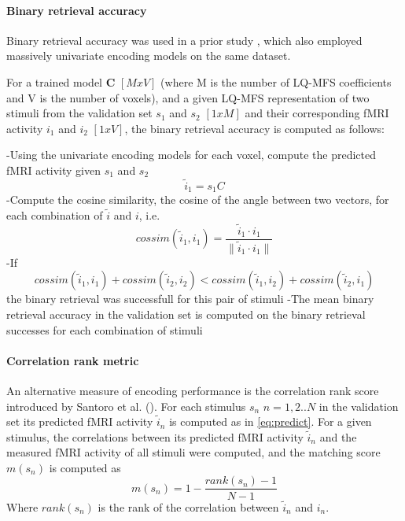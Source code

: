
\paragraph{Binary retrieval accuracy}

Binary retrieval accuracy \cite{ML08} was used in a prior study \cite{CTK+2012}, which also employed massively univariate encoding models on the same dataset.

For a trained model $\mathbf{C}$ $[M x V]$ (where M is the number of LQ-MFS coefficients and V is the number of voxels), and a given LQ-MFS representation of two stimuli from the validation set $s_{1}$ and $s_{2}$ $[1 x M]$ and their corresponding f{MRI} activity $i_{1}$ and $i_{2}$ $[ 1 x V ]$, the binary retrieval accuracy is computed as follows:

-Using the univariate encoding models for each voxel, compute the predicted f{MRI} activity given $s_{1}$ and $s_{2}$ 
\begin{equation}\label{eq:predict}
\widetilde{i}_{1} = s_{1}C
\end{equation}
-Compute the cosine similarity, the cosine of the angle between two vectors, for each combination of $\widetilde{i}$ and $i$, i.e.
\[ cossim(\widetilde{i}_{1},i_{1}) =  \frac{\widetilde{i}_{1} \cdot i_{1}}{\|\widetilde{i}_{1} \cdot i_{1}\|} \] 
-If \[ cossim(\widetilde{i}_{1},i_{1})+cossim(\widetilde{i}_{2},i_{2}) < cossim(\widetilde{i}_{1},i_{2})+cossim(\widetilde{i}_{2},i_{1}) \] the binary retrieval was successfull for this pair of stimuli
-The mean binary retrieval accuracy in the validation set is computed on the binary retrieval successes for each combination of stimuli

\paragraph{Correlation rank metric}
An alternative measure of encoding performance is the correlation rank score introduced by Santoro et al. (\cite{SF14}). For each stimulus $s_{n}$ $n=1,2..N$  in the validation set its predicted f{MRI} activity $\widetilde{i}_{n}$ is computed as in \ref{eq:predict}.
For a given stimulus, the correlations between its predicted f{MRI} activity $\widetilde{i}_{n}$ and the measured f{MRI} activity of all stimuli were computed, and the matching score $m(s_{n})$ is computed as
\[ m(s_{n}) = 1-\frac{rank(s_{n})-1}{N-1} \]
Where $rank(s_{n})$ is the rank of the correlation between $\widetilde{i}_{n}$ and $i_{n}$.

